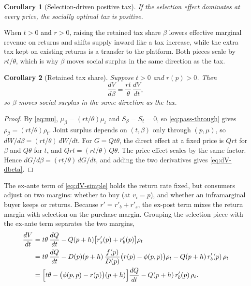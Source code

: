 \documentclass[11pt]{article}
\newtheorem{corollary}{Corollary}
\begin{document}
\begin{corollary}[Selection-driven positive tax]
\label{res:selection-positive-tax}
If the selection effect dominates at every price, the socially optimal tax is
positive.
\end{corollary}

When $t>0$ and $r>0$, raising the retained tax share $\beta$ lowers effective
marginal revenue on returns and shifts supply inward like a tax increase,
while the extra tax kept on existing returns is a transfer to the platform.
Both pieces scale by $rt/\theta$, which is why $\beta$ moves social surplus in the same direction as the tax.

\begin{corollary}[Retained tax share]
\label{res:beta-welfare}
Suppose $t>0$ and $r(p)>0$. Then
\begin{equation}
  \frac{dV}{d\beta}
  =
  \frac{rt}{\theta}\,\frac{dV}{dt},
  \label{eq:dV-dbeta}
\end{equation}
so $\beta$ moves social surplus in the same direction as the tax.
\end{corollary}
\begin{proof}
By \eqref{eq:mu}, $\mu_\beta=(rt/\theta)\mu_t$ and $S_\beta=S_t=0$, so \eqref{eq:pass-through} gives $\rho_\beta=(rt/\theta)\rho_t$. Joint surplus depends on $(t,\beta)$ only through $(p,\mu)$, so $dW/d\beta=(rt/\theta)\,dW/dt$. For $G=Qt\theta$, the direct effect at a fixed price is $Qrt$ for $\beta$ and $Q\theta$ for $t$, and $Qrt=(rt/\theta)\,Q\theta$. The price effect scales by the same factor. Hence $dG/d\beta=(rt/\theta)\,dG/dt$, and adding the two derivatives gives \eqref{eq:dV-dbeta}.
\end{proof}

The ex-ante term of \eqref{eq:dV-simple} holds the return rate fixed, but
consumers adjust on two margins: whether to buy (at $v_i=p$), and whether an
inframarginal buyer keeps or returns. Because $r'=r'_b+r'_s$, the ex-post term
mixes the return margin with selection on the purchase margin. Grouping the
selection piece with the ex-ante term separates the two margins,
\begin{align}
  \frac{dV}{dt}
  &=
  t\theta\,\frac{dQ}{dt}
  -Q(p+h)\bigl[r'_s(p)+r'_b(p)\bigr]\rho_t
  \notag\\
  &=
  t\theta\,\frac{dQ}{dt}
  -D(p)(p+h)\,\frac{f(p)}{D(p)}\bigl(r(p)-\phi(p,p)\bigr)\rho_t
  -Q(p+h)\,r'_b(p)\,\rho_t
  \notag\\
  &=
  \Bigl[
    t\theta-\bigl(\phi(p,p)-r(p)\bigr)(p+h)
  \Bigr]\frac{dQ}{dt}
  -Q(p+h)\,r'_b(p)\,\rho_t.
  \label{eq:dV-margins}
\end{align}
\end{document}

